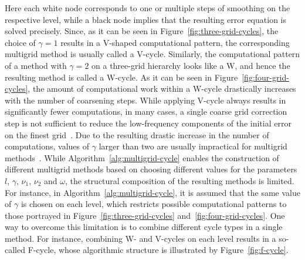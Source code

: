 Here each white node corresponds to one or multiple steps of smoothing on the respective level, while a black node implies that the resulting error equation is solved precisely.
Since, as it can be seen in Figure~\ref{fig:three-grid-cycles}, the choice of $\gamma = 1$ results in a V-shaped computational pattern, the corresponding multigrid method is usually called a V-cycle.
Similarly, the computational pattern of a method with $\gamma = 2$ on a three-grid hierarchy looks like a W, and hence the resulting method is called a W-cycle.
As it can be seen in Figure~\ref{fig:four-grid-cycles}, the amount of computational work within a W-cycle drastically increases with the number of coarsening steps.
While applying V-cycle always results in significantly fewer computations, in many cases, a single coarse grid correction step is not sufficient to reduce the low-frequency components of the initial error on the finest grid~\cite{trottenberg2000multigrid}.
Due to the resulting drastic increase in the number of computations, values of $\gamma$ larger than two are usually impractical for multigrid methods~\cite{trottenberg2000multigrid}.
While Algorithm~\ref{alg:multigrid-cycle} enables the construction of different multigrid methods based on choosing different values for the parameters $l$, $\gamma$, $\nu_1$, $\nu_2$ and $\omega$, the structural composition of the resulting methods is limited.
For instance, in Algorithm~\ref{alg:multigrid-cycle}, it is assumed that the same value of $\gamma$ is chosen on each level, which restricts possible computational patterns to those portrayed in Figure~\ref{fig:three-grid-cycles} and~\ref{fig:four-grid-cycles}.
One way to overcome this limitation is to combine different cycle types in a single method.
For instance, combining W- and V-cycles on each level results in a so-called F-cycle, whose algorithmic structure is illustrated by Figure~\ref{fig:f-cycle}.
